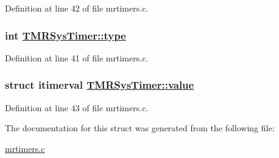 Definition at line 42 of file mrtimers.c.\hypertarget{structTMRSysTimer_4b6f19be2b38b35ed1401866ec85d1bf}{
\subsubsection[type]{\setlength{\rightskip}{0pt plus 5cm}int \hyperlink{structTMRSysTimer_4b6f19be2b38b35ed1401866ec85d1bf}{TMRSys\-Timer::type}}}
\label{structTMRSysTimer_4b6f19be2b38b35ed1401866ec85d1bf}




Definition at line 41 of file mrtimers.c.\hypertarget{structTMRSysTimer_582418d1e112e6ee5626fa92f6e42e0b}{
\subsubsection[value]{\setlength{\rightskip}{0pt plus 5cm}struct itimerval \hyperlink{structTMRSysTimer_582418d1e112e6ee5626fa92f6e42e0b}{TMRSys\-Timer::value}}}
\label{structTMRSysTimer_582418d1e112e6ee5626fa92f6e42e0b}




Definition at line 43 of file mrtimers.c.

The documentation for this struct was generated from the following file:\begin{CompactItemize}
\item 
\hyperlink{mrtimers_8c}{mrtimers.c}\end{CompactItemize}
